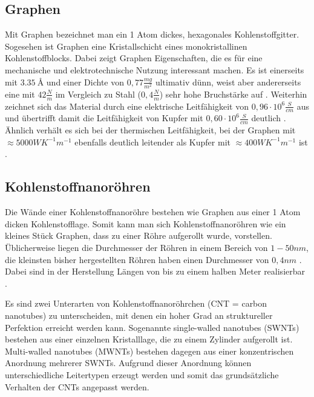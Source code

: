 \documentclass[12pt,a4paper]{report}%
\let\harvardleftorig\harvardleft
\numberwithin{equation}{section}
\newcommand\citevgl
{\def\harvardleft{(vgl.\ \global\let\harvardleft\harvardleftorig}%
 \cite
}
\newcommand\citeVgl
{\def\harvardleft{(Vgl.\ \global\let\harvardleft\harvardleftorig}%
 \cite
}
\numberwithin{equation}{subsection}
\begin{document}
  \subsection{Graphen}
  Mit Graphen bezeichnet man ein 1 Atom dickes, hexagonales Kohlenstoffgitter. Sogesehen ist Graphen eine Kristallschicht eines monokristallinen Kohlenstoffblocks. Dabei zeigt Graphen Eigenschaften, die es für eine mechanische und elektrotechnische Nutzung interessant machen. Es ist einerseits mit $\SI{3,35}{\angstrom}$ und einer Dichte von $0,77 \frac{mg}{m^2}$ ultimativ dünn, weist aber andererseits eine mit $42 \frac{N}{m}$ im Vergleich zu Stahl ($0,4 \frac{N}{m}$) sehr hohe Bruchstärke auf \citevgl{Chandrasekhar2018ConductingPolymers}. Weiterhin zeichnet sich das Material durch eine elektrische Leitfähigkeit von $0,96\cdot10^6 \frac{S}{cm}$ aus und übertrifft damit die Leitfähigkeit von Kupfer mit $0,60\cdot 10^6 \frac{S}{cm}$ deutlich\citevgl{Chandrasekhar2018ConductingPolymers}. Ähnlich verhält es sich bei der thermischen Leitfähigkeit, bei der Graphen mit $ \approx 5000WK^{-1}m^{-1}$ ebenfalls deutlich leitender als Kupfer mit $\approx 400WK^{-1}m^{-1}$ ist\citevgl{Chandrasekhar2018ConductingPolymers}.
  \newpage
  \subsection{Kohlenstoffnanoröhren}
  Die Wände einer Kohlenstoffnanoröhre bestehen wie Graphen aus einer 1 Atom dicken Kohlenstofflage. Somit kann man sich Kohlenstoffnanoröhren wie ein kleines Stück Graphen, dass zu einer Röhre aufgerollt wurde, vorstellen. Üblicherweise liegen die Durchmesser der Röhren in einem Bereich von $1-50nm$, die kleinsten bisher hergestellten Röhren haben einen Durchmesser von $0,4nm$\citevgl{Fujita2013Electricalconduction}. Dabei sind in der Herstellung Längen von bis zu einem halben Meter realisierbar \citevgl{Fujita2013Electricalconduction}.\newline
  
  Es sind zwei Unterarten von Kohlenstoffnanoröhrchen (CNT = carbon nanotubes) zu unterscheiden, mit denen ein hoher Grad an struktureller Perfektion erreicht werden kann. Sogenannte single-walled nanotubes (SWNTs) bestehen aus einer einzelnen Kristalllage, die zu einem Zylinder aufgerollt ist. Multi-walled nanotubes (MWNTs) bestehen dagegen aus einer konzentrischen Anordnung mehrerer SWNTs. Aufgrund dieser Anordnung können unterschiedliche Leitertypen erzeugt werden und somit das grundsätzliche Verhalten der CNTs angepasst werden.\citeVgl{Baughman787}
\end{document}
